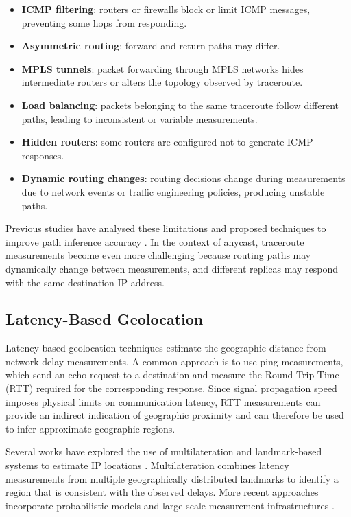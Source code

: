 \begin{itemize}
    \item \textbf{ICMP filtering}: routers or firewalls block or limit ICMP messages, preventing some hops from responding.
    \item \textbf{Asymmetric routing}: forward and return paths may differ.    
    \item \textbf{MPLS tunnels}: packet forwarding through MPLS networks hides intermediate routers or alters the topology observed by traceroute.
    \item \textbf{Load balancing}: packets belonging to the same traceroute follow different paths, leading to inconsistent or variable measurements.
    \item \textbf{Hidden routers}: some routers are configured not to generate ICMP responses.
    \item \textbf{Dynamic routing changes}: routing decisions change during measurements due to network events or traffic engineering policies, producing unstable paths.
\end{itemize}

Previous studies have analysed these limitations and proposed techniques to improve path inference accuracy \cite{Dainotti2012IssuesClassification}. In the context of anycast, traceroute measurements become even more challenging because routing paths may dynamically change between measurements, and different replicas may respond with the same destination IP address.

\subsection{Latency-Based Geolocation}
\label{sc:background_location_measurements_latency_geolocation}

Latency-based geolocation techniques estimate the geographic distance from network delay measurements. A common approach is to use ping measurements, which send an echo request to a destination and measure the Round-Trip Time (RTT) required for the corresponding response. Since signal propagation speed imposes physical limits on communication latency, RTT measurements can provide an indirect indication of geographic proximity and can therefore be used to infer approximate geographic regions.

Several works have explored the use of multilateration and landmark-based systems to estimate IP locations \cite{Cicalese2015AGeolocation, Cicalese2016Latency-BasedSets}. Multilateration combines latency measurements from multiple geographically distributed landmarks to identify a region that is consistent with the observed delays. More recent approaches incorporate probabilistic models and large-scale measurement infrastructures \cite{Kohls2022VerLoc:Systems, Sommese2020MAnycast2:Anycast}.

